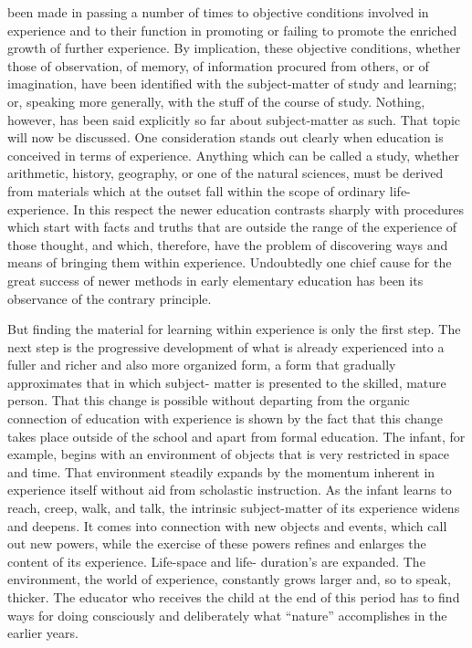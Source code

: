 
 been made in passing a number of times to objective conditions 
involved in experience and to their function in promoting or failing to promote the 
enriched growth of further experience. By implication, these objective conditions, 
whether those of observation, of memory, of information procured from others, or of 
imagination, have been identified with the subject-matter of study and learning; or, 
speaking more generally, with the stuff of the course of study. Nothing, however, has 
been said explicitly so far about subject-matter as such. That topic will now be discussed. 
One consideration stands out clearly when education is conceived in terms of experience. 
Anything which can be called a study, whether arithmetic, history, geography, or one of 
the natural sciences, must be derived from materials which at the outset fall within the 
scope of ordinary life-experience. In this respect the newer education contrasts sharply 
with procedures which start with facts and truths that are outside the range of the 
experience of those thought, and which, therefore, have the problem of discovering ways 
and means of bringing them within experience. Undoubtedly one chief cause for the great 
success of newer methods in early elementary education has been its observance of the 
contrary principle. 

But finding the material for learning within experience is only the first step. The next 
step is the progressive development of what is already experienced into a fuller and richer 
and also more organized form, a form that gradually approximates that in which subject- 
matter is presented to the skilled, mature person. That this change is possible without 
departing from the organic connection of education with experience is shown by the fact 
that this change takes place outside of the school and apart from formal education. The 
infant, for example, begins with an environment of objects that is very restricted in space 
and time. That environment steadily expands by the momentum inherent in experience 
itself without aid from scholastic instruction. As the infant learns to reach, creep, walk, 
and talk, the intrinsic subject-matter of its experience widens and deepens. It comes into 
connection with new objects and events, which call out new powers, while the exercise of 
these powers refines and enlarges the content of its experience. Life-space and life- 
duration’s are expanded. The environment, the world of experience, constantly grows 
larger and, so to speak, thicker. The educator who receives the child at the end of this 
period has to find ways for doing consciously and deliberately what \enquote{nature}
accomplishes in the earlier years. 


